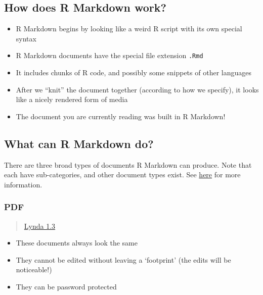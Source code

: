 \documentclass[]{article}
\providecommand{\tightlist}{%
  \setlength{\itemsep}{0pt}\setlength{\parskip}{0pt}}
\begin{document}
\hypertarget{how-does-r-markdown-work}{%
\subsection{How does R Markdown work?}\label{how-does-r-markdown-work}}

\begin{itemize}
\tightlist
\item
  R Markdown begins by looking like a weird R script with its own
  special syntax
\item
  R Markdown documents have the special file extension \texttt{.Rmd}
\item
  It includes chunks of R code, and possibly some snippets of other
  languages
\item
  After we ``knit'' the document together (according to how we specify),
  it looks like a nicely rendered form of media
\item
  The document you are currently reading was built in R Markdown!
\end{itemize}

\hypertarget{what-can-r-markdown-do}{%
\subsection{What can R Markdown do?}\label{what-can-r-markdown-do}}

There are three broad types of documents R Markdown can produce. Note
that each have sub-categories, and other document types exist. See
\href{https://rmarkdown.rstudio.com/lesson-9.html}{here} for more
information.

\hypertarget{pdf}{%
\subsubsection{PDF}\label{pdf}}

\begin{quote}
\href{https://www.lynda.com/RStudio-tutorials/Writing-PDF-reports-R-Markdown/699348/2800210-4.html?srchtrk=index\%3a1\%0alinktypeid\%3a2\%0aq\%3ar+markdown\%0apage\%3a1\%0as\%3arelevance\%0asa\%3atrue\%0aproducttypeid\%3a2}{Lynda
1.3}
\end{quote}

\begin{itemize}
\tightlist
\item
  These documents always look the same
\item
  They cannot be edited without leaving a `footprint' (the edits will be
  noticeable!)
\item
  They can be password protected
\end{itemize}
\end{document}
